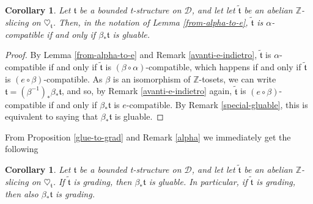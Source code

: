 \documentclass{article}
\newtheorem{cor}[thm]{Corollary}
\theoremstyle{definition}
\newcommand{\Z}{\mathbb{Z}}
\newcommand{\tee}{\mathfrak{t}}
\begin{document}
\begin{cor}
Let $\mathfrak{t}$ be a bounded t-structure on $\mathscr{D}$, and let let $\tilde{\tee}$ be an abelian $\mathbb{Z}$-slicing on $\heartsuit_{\mathfrak{t}}$. Then, in the notation of Lemma \ref{from-alpha-to-e}, $\tilde{\tee}$ is $\alpha$-compatible if and only if $\beta_*\tee$ is gluable.
\end{cor}
\begin{proof}
By Lemma \ref{from-alpha-to-e} and Remark \ref{avanti-e-indietro}, $\tilde{\tee}$ is $\alpha$-compatible if and only if $\tilde{\tee}$ is $(\beta\circ\alpha)$-compatible, which happens if and only if $\tilde{\tee}$ is $(e\circ\beta)$-compatible. As $\beta$ is an isomorphism of $\Z$-tosets, we can write $\tee=(\beta^{-1})_*\beta_*\tee$, and so, by Remark \ref{avanti-e-indietro} again, $\tilde{\tee}$ is $(e\circ\beta)$-compatible if and only if $\beta_*\tee$ is $e$-compatible. By Remark \ref{special-gluable}, this is equivalent to saying that $\beta_*\tee$ is gluable. 
\end{proof}
From Proposition \ref{glue-to-grad} and Remark \ref{alpha} we immediately get the following
\begin{cor}
Let $\mathfrak{t}$ be a bounded t-structure on $\mathscr{D}$, and let let $\tilde{\tee}$ be an abelian $\mathbb{Z}$-slicing on $\heartsuit_{\mathfrak{t}}$. If $\tilde{\tee}$ is grading, then $\beta_*\tee$ is gluable. In particular, if $\tilde{\tee}$ is grading, then also $\beta_*\tee$ is grading.
\end{cor}
\end{document}
